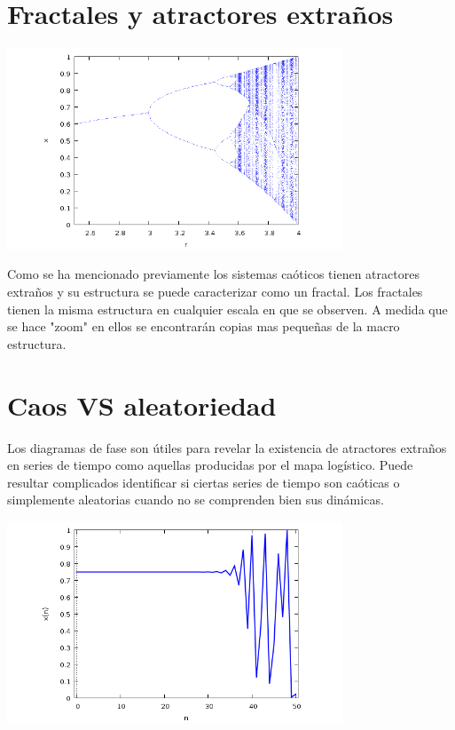 \documentclass{article} %
\begin{document}
\section*{Fractales y atractores extraños}

\begin{center}

	\includegraphics[width=10cm]{6.png}
    
\end{center}

Como se ha mencionado previamente los sistemas caóticos tienen atractores extraños y su estructura se puede caracterizar como un fractal. Los fractales tienen la misma estructura en cualquier escala en que se observen. A medida que se hace "zoom" en ellos se encontrarán copias mas pequeñas de la macro estructura. 


\section*{Caos VS aleatoriedad}

Los diagramas de fase son útiles para revelar la existencia de atractores extraños en series de tiempo como aquellas producidas por el mapa logístico. Puede resultar complicados identificar si ciertas series de tiempo son caóticas o simplemente aleatorias cuando no se comprenden bien sus dinámicas. 

\begin{center}

	\includegraphics[width=10cm]{7.png}
    
\end{center}
\end{document}
